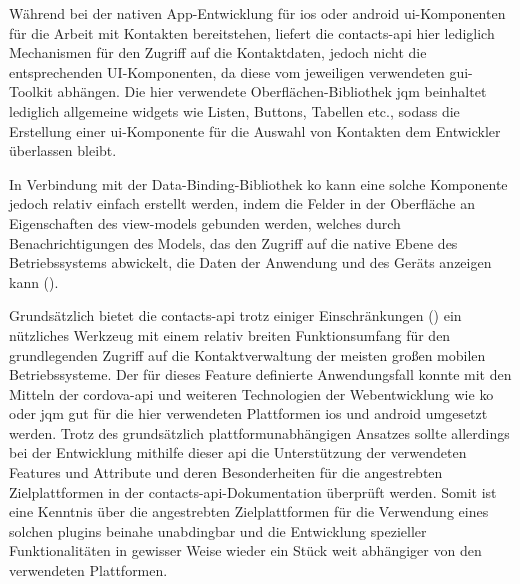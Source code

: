 Während bei der nativen App-Entwicklung für \gls{ios} oder \gls{android} \gls{ui}-Kom\-po\-nen\-ten für die Arbeit mit Kontakten bereitstehen, liefert die \gls{contacts-api} hier lediglich Mechanismen für den Zugriff auf die Kontaktdaten, jedoch nicht die entsprechenden UI-Komponenten, da diese vom jeweiligen verwendeten \gls{gui}-Toolkit abhängen.
Die hier verwendete Oberflächen-Bibliothek \gls{jqm} beinhaltet lediglich allgemeine \glspl{widget} wie Listen, Buttons, Tabellen etc., sodass die Erstellung einer \gls{ui}-Komponente für die Auswahl von Kontakten dem Entwickler überlassen bleibt.

In Verbindung mit der Data-Binding-Bibliothek \gls{ko} kann eine solche Komponente jedoch relativ einfach erstellt werden, indem die Felder in der Oberfläche an Eigenschaften des \glspl{view-model} gebunden werden, welches durch Benachrichtigungen des Models, das den Zugriff auf die native Ebene des Betriebssystems abwickelt, die Daten der Anwendung und des Geräts anzeigen kann ().

Grundsätzlich bietet die \gls{contacts-api} trotz einiger Einschränkungen (\so) ein nützliches Werkzeug mit einem relativ breiten Funktionsumfang für den grundlegenden Zugriff auf die Kontaktverwaltung der meisten großen mobilen Betriebssysteme.
Der für dieses Feature definierte Anwendungsfall konnte mit den Mitteln der \gls{cordova}-\gls{api} und weiteren Technologien der Webentwicklung wie \gls{ko} oder \gls{jqm} gut für die hier verwendeten Plattformen \gls{ios} und \gls{android} umgesetzt werden.
Trotz des grundsätzlich plattformunabhängigen Ansatzes sollte allerdings bei der Entwicklung mithilfe dieser \gls{api} die Unterstützung der verwendeten Features und Attribute und deren Besonderheiten für die angestrebten Zielplattformen in der \gls{contacts-api}-Dokumentation überprüft werden.
Somit ist eine Kenntnis über die angestrebten Zielplattformen für die Verwendung eines solchen \glspl{plugin} beinahe unabdingbar und die Entwicklung spezieller Funktionalitäten in gewisser Weise wieder ein Stück weit abhängiger von den verwendeten Plattformen. %



